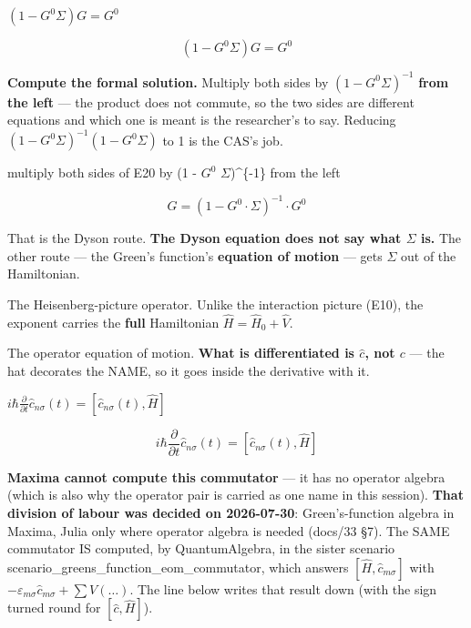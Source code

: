 \documentclass[dvipdfmx]{article}
\begin{document}
$(1 - G^0 \Sigma) G = G^0$

\begin{equation}
  (1 - G^0 \Sigma) G = G^0
  \label{eq:E20}
\end{equation}

\textbf{Compute the formal solution.} Multiply both sides by $(1-G^0\Sigma)^{-1}$ \textbf{from the left} — the product does not commute, so the two sides are different equations and which one is meant is the researcher's to say. Reducing $(1-G^0\Sigma)^{-1}(1-G^0\Sigma)$ to 1 is the CAS's job.

multiply both sides of E20 by (1 - $G^0$ $\Sigma$)\^{}\{-1\} from the left

\begin{equation}
  G=\left(1-G^{0}\cdot \Sigma\right)^{-1}\cdot G^{0}
  \label{eq:E21}
\end{equation}

That is the Dyson route. \textbf{The Dyson equation does not say what $\Sigma$ is.} The other route — the Green's function's \textbf{equation of motion} — gets $\Sigma$ out of the Hamiltonian.

The Heisenberg-picture operator. Unlike the interaction picture (E10), the exponent carries the \textbf{full} Hamiltonian $\hat H=\hat H_0+\hat V$.

The operator equation of motion. \textbf{What is differentiated is $\hat c$, not $c$} — the hat decorates the NAME, so it goes inside the derivative with it.

$i\hbar \frac{\partial}{\partial t} \hat c_{n\sigma}(t) = [\hat c_{n\sigma}(t), \hat H]$

\begin{equation}
  i\hbar \frac{\partial}{\partial t} \hat c_{n\sigma}(t) = [\hat c_{n\sigma}(t), \hat H]
  \label{eq:E22}
\end{equation}

\textbf{Maxima cannot compute this commutator} — it has no operator algebra (which is also why the operator pair is carried as one name in this session). \textbf{That division of labour was decided on 2026-07-30}: Green's-function algebra in Maxima, Julia only where operator algebra is needed (docs/33 §7). The SAME commutator IS computed, by QuantumAlgebra, in the sister scenario scenario\_greens\_function\_eom\_commutator, which answers $[\hat H,\hat c_{m\sigma}]$ with $-\varepsilon_{m\sigma}\hat c_{m\sigma} + \sum V(\ldots)$. The line below writes that result down (with the sign turned round for $[\hat c,\hat H]$).
\end{document}
